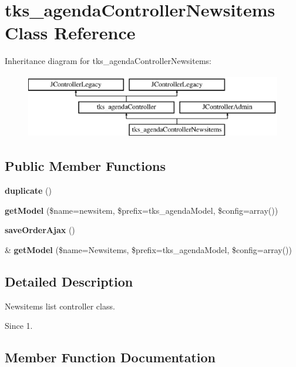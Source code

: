 \section{tks\+\_\+agenda\+Controller\+Newsitems Class Reference}
\label{classtks__agenda_controller_newsitems}
Inheritance diagram for tks\+\_\+agenda\+Controller\+Newsitems\+:\begin{figure}[H]
\begin{center}
\leavevmode
\includegraphics[height=2.814070cm]{classtks__agenda_controller_newsitems}
\end{center}
\end{figure}
\subsection*{Public Member Functions}
\begin{DoxyCompactItemize}
\item 
\textbf{ duplicate} ()
\item 
\textbf{ get\+Model} (\$name=\textquotesingle{}newsitem\textquotesingle{}, \$prefix=\textquotesingle{}tks\+\_\+agenda\+Model\textquotesingle{}, \$config=array())
\item 
\textbf{ save\+Order\+Ajax} ()
\item 
\& \textbf{ get\+Model} (\$name=\textquotesingle{}Newsitems\textquotesingle{}, \$prefix=\textquotesingle{}tks\+\_\+agenda\+Model\textquotesingle{}, \$config=array())
\end{DoxyCompactItemize}


\subsection{Detailed Description}
Newsitems list controller class.

\begin{DoxySince}{Since}
1. 
\end{DoxySince}


\subsection{Member Function Documentation}
\mbox{\label{classtks__agenda_controller_newsitems_a982be2ab3c656d4d6aec2c29e3eba956}} 
